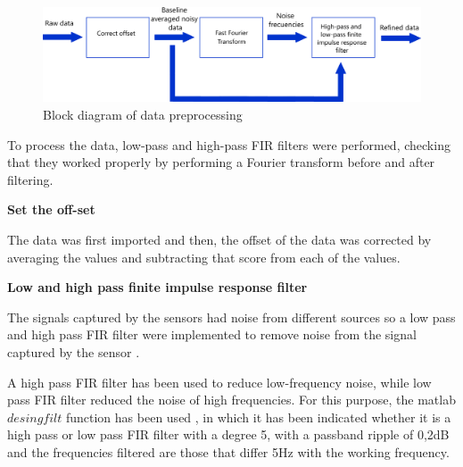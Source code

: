 \documentclass[12pt, a4paper]{article} %
\begin{document}
	\setlength{\parskip}{4mm}
	
	\begin{figure}[htbp]
		\centering
		\includegraphics[width=1\textwidth]{figures/esquema_preprocesado_metodos_1.png}
		\caption{Block diagram of data preprocessing}
		\label{fig:esquema_preprocesado}
	\end{figure}
	
	To process the data, low-pass and high-pass FIR filters were performed, checking that they worked properly by performing a Fourier transform before and after filtering. 
	
	\setlength{\parskip}{8mm}
	\setlength{\parindent}{0pt}
	
	\newpage
	
	\textbf{Set the off-set}
	\setlength{\parskip}{0mm}
	
	The data was first imported and then, the offset of the data was corrected by averaging the values and subtracting that score from each of the values. 
	
	\setlength{\parindent}{8pt}
	\setlength{\parskip}{4mm}
	
	\setlength{\parindent}{0pt}
	\setlength{\parskip}{8mm}
	\textbf{Low and high pass finite impulse response filter}
	\setlength{\parskip}{0mm}
	
	The signals captured by the sensors had noise from different sources so a low pass and high pass FIR filter were implemented to remove noise from the signal captured by the sensor \cite{mondal2012novel}. 
	
	\setlength{\parskip}{4mm}
	\setlength{\parindent}{8pt}
	
	A high pass FIR filter has been used to reduce low-frequency noise, while low pass FIR filter reduced the noise of high frequencies. For this purpose, the matlab $desingfilt$ function has been used \cite{jacob2015digital}, in which it has been indicated whether it is a high pass or low pass FIR filter with a degree 5, with a passband ripple of 0,2dB and the frequencies filtered are those that differ 5Hz with the working frequency.
	
\end{document}
